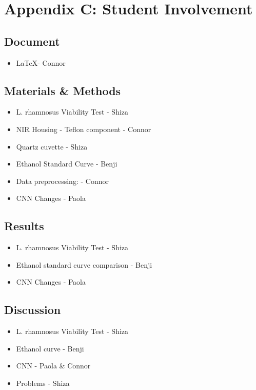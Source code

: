 \documentclass[final, 3p, 11pt]{elsarticle}
\begin{document}
\newpage
\section*{Appendix C: Student Involvement}

\subsection*{Document}
\begin{itemize}
    \item \LaTeX - Connor
\end{itemize}

\subsection*{Materials \& Methods}
\begin{itemize}
    \item L. rhamnosus Viability Test - Shiza
    \item NIR Housing - Teflon component - Connor
    \item Quartz cuvette - Shiza
    \item Ethanol Standard Curve - Benji
    \item Data preprocessing: - Connor
    \item CNN Changes - Paola   
\end{itemize}

\subsection*{Results}
\begin{itemize}
    \item L. rhamnosus Viability Test - Shiza
    \item Ethanol standard curve comparison - Benji
    \item CNN Changes - Paola   
\end{itemize}

\subsection*{Discussion}
\begin{itemize}
    \item L. rhamnosus Viability Test - Shiza
    \item Ethanol curve - Benji
    \item CNN - Paola \& Connor
    \item Problems - Shiza
\end{itemize}
\end{document}
